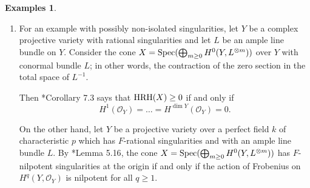 \documentclass[letterpaper,11pt]{amsart}
\theoremstyle{plain}
\theoremstyle{definition}
\newtheorem{egs}[thm]{Examples}
\theoremstyle{remark}
\def\Z{{\mathbf Z}}
\def\cO{\mathcal{O}}
\def\frm{\mathfrak{m}}
\begin{document}
\begin{egs}
\begin{enumerate}
Finally, $X_{\mathbf F_p}$ is known to be $F$-nilpotent. To see this, we have the short exact sequence
\[ 0 \to R_{\mathbf F_p} \to \widetilde{R}_{\mathbf F_p} \to \mathbf F_p \cdot (\overline{s^2t^2}) \to 0,\]
which, in view of $\widetilde{R}_{\mathbf F_p}$ being normal, gives isomorphisms 
\begin{align*}H^1_{\frm}(R_{\mathbf F_p}) &\cong \mathbf F_p,\\
H^2_{\frm}(R_{\mathbf F_p}) &\cong H^2_{\frm}(\widetilde{R}_{\mathbf F_p}).
\end{align*}

Note that Frobenius acts by zero on $\mathbf F_p \cdot (\overline{s^2t^2})$: indeed, for any prime $p$, we have $s^{2p} t^{2p} \in R_{\mathbf F_p}$ (obvious for $p=2$ and for $p=2k+1$ odd, we have $s^{4k+2}t^{4k+2} = (st^3)^2(s^4)^k (t^4)^{k-1}$). Thus, $R_{\mathbf F_p}$ is weakly $F$-nilpotent.

Finally, $\widetilde{R}_{\mathbf F_p}$, being a direct summand of the polynomial ring $\mathbf F_p[s,t]$, is strongly $F$-regular \cite{HochsterHunekeFRegular}*{Theorem 5.5(e)}, hence $F$-rational \cite{HochsterHunekeFRegular}*{Theorem 4.2(a)}. 

Now, we claim $0^*_{H^2_{\frm}(R)} = 0$. For this, let $\eta \in 0^*_{H^2_{\frm}(R_{\mathbf F_p})}$. By definition, this means there exists $c\in R\setminus \{0\}$ and $e_0 \in \Z_{\geq 1}$ with $c F^e(\eta) = 0$ for all $e \geq e_0$. If we view this equality in the isomorphic space $H^2_{\frm}(\widetilde{R}_{\mathbf F_p})$, we conclude by Frobenius compatibility and the fact that $R_{\mathbf F_p} \subseteq \widetilde{R}_{\mathbf F_p}$ is an inclusion of domains, that $\eta \in 0^*_{H^2_{\frm}(\widetilde{R}_{\mathbf F_p})} = \{0\}$, by $F$-rationality. Thus, $\eta = 0$ in $H^2_{\frm}(R_{\mathbf F_p})$, too, proving the claim.

\item For an example with possibly non-isolated singularities, let $Y$ be a complex projective variety with rational singularities and let $L$ be an ample line bundle on $Y$. Consider the cone $X = {\rm Spec}(\bigoplus_{m\geq 0} H^0(Y,L^{\otimes m}))$ over $Y$ with conormal bundle $L$; in other words, the contraction of the zero section in the total space of $L^{-1}$. 

Then \cite{CDOIsolated}*{Corollary 7.3} says that ${\rm HRH}(X) \geq 0$ if and only if \[
H^1(\cO_Y) = \ldots = H^{\dim Y}(\cO_Y) = 0.
\]

On the other hand, let $Y$ be a projective variety over a perfect field $k$ of characteristic $p$ which has $F$-rational singularities and with an ample line bundle $L$. By \cite{MaddoxMiller}*{Lemma 5.16}, the cone $X = {\rm Spec}(\bigoplus_{m\geq 0} H^0(Y,L^{\otimes m}))$ has $F$-nilpotent singularities at the origin if and only if the action of Frobenius on $H^q(Y,\cO_Y)$ is nilpotent for all $q\geq 1$.
\end{enumerate}
\end{egs}



\end{document}
